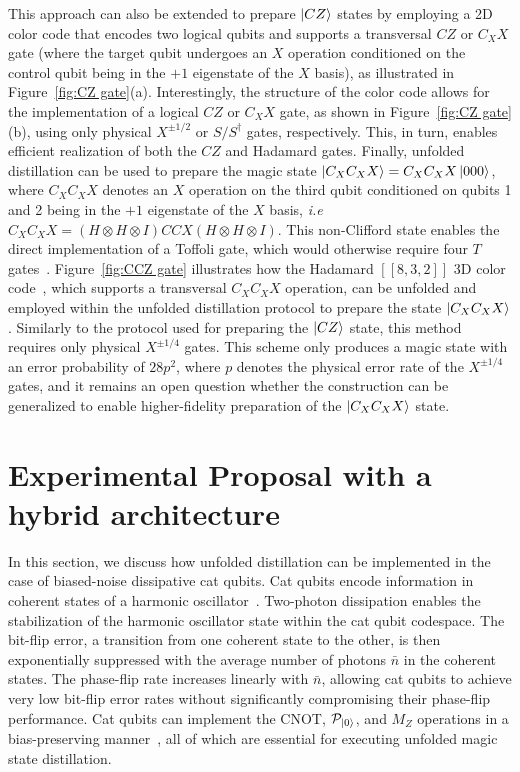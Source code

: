 \documentclass[%
 reprint,
superscriptaddress,
 amsmath,amssymb,
 aps,
]{revtex4-2}
\begin{document}
This approach can also be extended to prepare $\ket{CZ}$ states by employing a 2D color code that encodes two logical qubits and supports a transversal $CZ$ or $C_X X$ gate (where the target qubit undergoes an $X$ operation conditioned on the control qubit being in the $+1$ eigenstate of the $X$ basis), as illustrated in Figure~\ref{fig:CZ gate}(a). Interestingly, the structure of the color code allows for the implementation of a logical $CZ$ or $C_X X$ gate, as shown in Figure~\ref{fig:CZ gate}(b), using only physical $X^{\pm 1/2}$ or $S/S^\dagger$ gates, respectively. This, in turn, enables efficient realization of both the $CZ$ and Hadamard gates. Finally, unfolded distillation can be used to prepare the magic state $\ket{C_XC_XX} = C_XC_XX \ket{000}$, where $C_XC_XX$ denotes an $X$ operation on the third qubit conditioned on qubits 1 and 2 being in the $+1$ eigenstate of the $X$ basis, \textit{i.e} $C_XC_X X = (H \otimes H \otimes I) CCX (H \otimes H \otimes I)$. This non-Clifford state enables the direct implementation of a Toffoli gate, which would otherwise require four $T$ gates~\cite{selinger2013quantum}. Figure~\ref{fig:CCZ gate} illustrates how the Hadamard $[[8,3,2]]$ 3D color code~\cite{kubica2015unfolding}, which supports a transversal $C_XC_X X$ operation, can be unfolded and employed within the unfolded distillation protocol to prepare the state $\ket{C_XC_X X}$. Similarly to the protocol used for preparing the $\ket{CZ}$ state, this method requires only physical $X^{\pm 1/4}$ gates. This scheme only produces a magic state with an error probability of $28p^2$, where $p$ denotes the physical error rate of the $X^{\pm 1/4}$ gates, and it remains an open question whether the construction can be generalized to enable higher-fidelity preparation of the $\ket{C_XC_X X}$ state.

\section{Experimental Proposal with a hybrid architecture}
\label{sec:hybrid}

In this section, we discuss how unfolded distillation can be implemented in the case of biased-noise dissipative cat qubits. Cat qubits encode information in coherent states of a harmonic oscillator~\cite{mirrahimi2014dynamically}. Two-photon dissipation enables the stabilization of the harmonic oscillator state within the cat qubit codespace. The bit-flip error, a transition from one coherent state to the other, is then exponentially suppressed with the average number of photons $\bar n$ in the coherent states. The phase-flip rate increases linearly with $\bar{n}$, allowing cat qubits to achieve very low bit-flip error rates without significantly compromising their phase-flip performance. Cat qubits can implement the CNOT, $\mathcal{P}_{\ket{0}}$, and $M_Z$ operations in a bias-preserving manner~\cite{guillaud2019repetition}, all of which are essential for executing unfolded magic state distillation.
\end{document}
